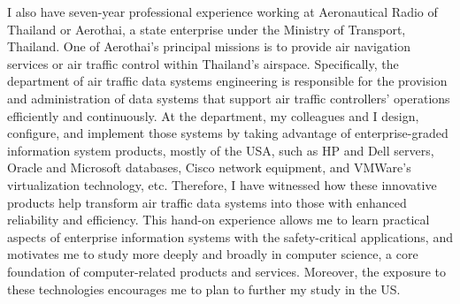 \documentclass[a4paper,10pt]{report}
\begin{document}
\vspace{0.2cm}
I also have seven-year professional experience working at Aeronautical Radio of Thailand or Aerothai, a state enterprise under the Ministry of Transport, Thailand. One of Aerothai's principal missions is to provide air navigation services or air traffic control within Thailand's airspace. Specifically, the department of air traffic data systems engineering is responsible for the provision and administration of data systems that support air traffic controllers' operations efficiently and continuously. At the department, my colleagues and I design, configure, and implement those systems by taking advantage of enterprise-graded information system products, mostly of the USA, such as HP and Dell servers, Oracle and Microsoft databases, Cisco network equipment, and VMWare's virtualization technology, etc. Therefore, I have witnessed how these innovative products help transform air traffic data systems into those with enhanced reliability and efficiency. This hand-on experience allows me to learn practical aspects of enterprise information systems with the safety-critical applications, and motivates me to study more deeply and broadly in computer science, a core foundation of computer-related products and services. Moreover, the exposure to these technologies encourages me to plan to further my study in the US.
\end{document}
